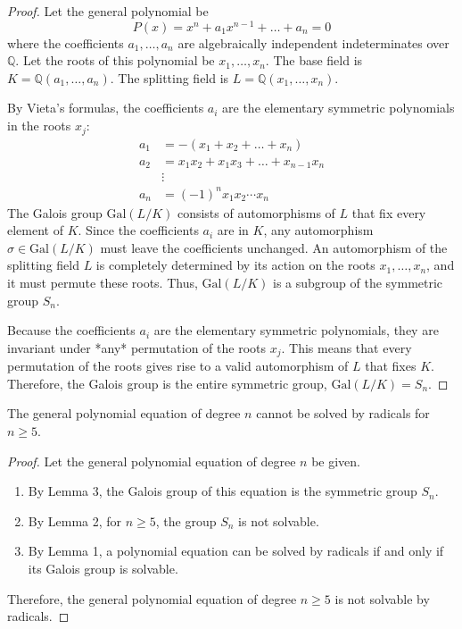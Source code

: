 \begin{proof}
Let the general polynomial be
$$P(x) = x^n + a_1 x^{n-1} + \dots + a_n = 0$$
where the coefficients $a_1, \dots, a_n$ are algebraically independent indeterminates over $\mathbb{Q}$. Let the roots of this polynomial be $x_1, \dots, x_n$. The base field is $K = \mathbb{Q}(a_1, \dots, a_n)$. The splitting field is $L = \mathbb{Q}(x_1, \dots, x_n)$.

By Vieta's formulas, the coefficients $a_i$ are the elementary symmetric polynomials in the roots $x_j$:
\begin{align*}
a_1 &= -(x_1 + x_2 + \dots + x_n) \\
a_2 &= x_1x_2 + x_1x_3 + \dots + x_{n-1}x_n \\
&\vdots \\
a_n &= (-1)^n x_1x_2\cdots x_n
\end{align*}
The Galois group $\text{Gal}(L/K)$ consists of automorphisms of $L$ that fix every element of $K$. Since the coefficients $a_i$ are in $K$, any automorphism $\sigma \in \text{Gal}(L/K)$ must leave the coefficients unchanged. An automorphism of the splitting field $L$ is completely determined by its action on the roots $x_1, \dots, x_n$, and it must permute these roots. Thus, $\text{Gal}(L/K)$ is a subgroup of the symmetric group $S_n$.

Because the coefficients $a_i$ are the elementary symmetric polynomials, they are invariant under *any* permutation of the roots $x_j$. This means that every permutation of the roots gives rise to a valid automorphism of $L$ that fixes $K$. Therefore, the Galois group is the entire symmetric group, $\text{Gal}(L/K) = S_n$.
\end{proof}



\begin{theorem}
The general polynomial equation of degree $n$ cannot be solved by radicals for $n \ge 5$.
\end{theorem}

\begin{proof}
Let the general polynomial equation of degree $n$ be given.
\begin{enumerate}
    \item By Lemma 3, the Galois group of this equation is the symmetric group $S_n$.
    \item By Lemma 2, for $n \ge 5$, the group $S_n$ is not solvable.
    \item By Lemma 1, a polynomial equation can be solved by radicals if and only if its Galois group is solvable.
\end{enumerate}
Therefore, the general polynomial equation of degree $n \ge 5$ is not solvable by radicals.
\end{proof}



